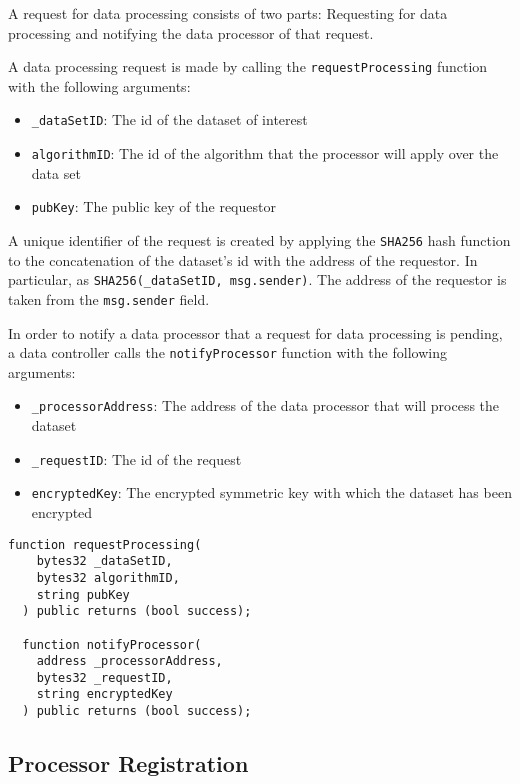 A request for data processing consists of two parts: Requesting for data processing and notifying the data processor of that request.

A data processing request is made by calling the \verb|requestProcessing| function with the following arguments:

\begin{itemize}
  \item \verb|_dataSetID|: The id of the dataset of interest
  \item \verb|algorithmID|: The id of the algorithm that the processor will apply over the data set
  \item \verb|pubKey|: The public key of the requestor
\end{itemize}

A unique identifier of the request is created by applying the \verb|SHA256| hash function to the concatenation of the dataset's id with the address of the requestor. In particular, as \verb|SHA256(_dataSetID, msg.sender)|. The address of the requestor is taken from the \verb|msg.sender| field.

In order to notify a data processor that a request for data processing is pending, a data controller calls the \verb|notifyProcessor| function with the following arguments:

\begin{itemize}
  \item \verb|_processorAddress|: The address of the data processor that will process the dataset
  \item \verb|_requestID|: The id of the request
  \item \verb|encryptedKey|: The encrypted symmetric key with which the dataset has been encrypted
\end{itemize}

\begin{lstlisting}[language=Solidity, caption={Request for processing functions}]
  function requestProcessing(
    bytes32 _dataSetID,
    bytes32 algorithmID,
    string pubKey
  ) public returns (bool success);

  function notifyProcessor(
    address _processorAddress,
    bytes32 _requestID,
    string encryptedKey
  ) public returns (bool success);

\end{lstlisting}

\subsection{Processor Registration}
\label{implemenation:contracts:reg_processor}


